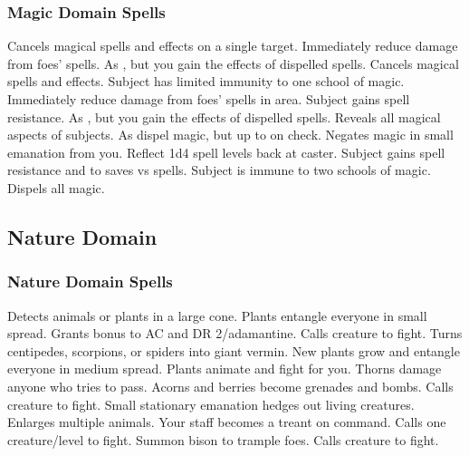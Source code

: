 \subsubsection{Magic Domain Spells}
\begin{spelllist}
   Cancels magical spells and effects on a single target.
   Immediately reduce damage from foes' spells.
  \spellhead[2]{}
   As , but you gain the effects of dispelled spells.
   Cancels magical spells and effects.
   Subject has limited immunity to one school of magic. 
   Immediately reduce damage from foes' spells in area.
   Subject gains spell resistance.
  \spellhead[5]{}
   As , but you gain the effects of dispelled spells.
  \F Reveals all magical aspects of subjects.
   As dispel magic, but up to  on check.
   Negates magic in small emanation from you.
   Reflect 1d4 spell levels back at caster.
   Subject gains spell resistance and  to saves vs spells.
   Subject is immune to two schools of magic.
   Dispels all magic.
  \spellhead[9]{}
\end{spelllist}
\subsection{Nature Domain}

\subsubsection{Nature Domain Spells}
\begin{spelllist}
   Detects animals or plants in a large cone.
   Plants entangle everyone in small spread.
   Grants  bonus to AC and DR 2/adamantine.
  \spellhead[2]{}
  \spellhead[3]{}
   Calls creature to fight.
   Turns centipedes, scorpions, or spiders into giant vermin.
   New plants grow and entangle everyone in medium spread.
   Plants animate and fight for you.
   Thorns damage anyone who tries to pass.
   Acorns and berries become grenades and bombs.
   Calls creature to fight.
   Small stationary emanation hedges out living creatures.
   Enlarges multiple animals.
   Your staff becomes a treant on command.
   Calls one creature/level to fight.
   Summon bison to trample foes.
   Calls creature to fight.
\end{spelllist}


